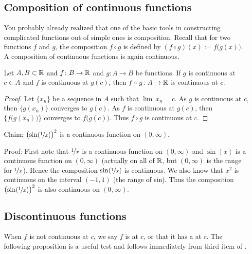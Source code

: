 \subsection{Composition of continuous functions}

You probably already realized that one of the basic tools in
constructing complicated functions out of simple ones is composition.
Recall that for two functions $f$ and $g$,
the composition $f \circ g$ is defined by
$(f \circ g)(x) := f\bigl(g(x)\bigr)$.
A composition of
continuous functions is again
continuous.

\begin{prop} \label{prop:compositioncont}
Let $A, B \subset {\mathbb{R}}$ and $f \colon B \to {\mathbb{R}}$ and $g \colon A \to B$ be
functions.  If $g$ is continuous at $c \in A$ and
$f$ is continuous at $g(c)$, then $f \circ g \colon A \to {\mathbb{R}}$ is continuous
at $c$.
\end{prop}

\begin{proof}
Let $\{ x_n \}$ be a sequence in $A$ such that $\lim\, x_n = c$.
As $g$ is continuous at $c$, then $\{ g(x_n) \}$ converges to $g(c)$.
As $f$ is continuous at $g(c)$, then $\{ f\bigl(g(x_n)\bigr) \}$ converges
to $f\bigl(g(c)\bigr)$.
Thus $f \circ g$ is continuous at $c$.
\end{proof}

\begin{example}
Claim: ${\bigl(\sin(\nicefrac{1}{x})\bigr)}^2$ is a continuous function on $(0,\infty)$.

Proof: First note that $\nicefrac{1}{x}$ is a continuous function on
$(0,\infty)$ and $\sin(x)$ is a continuous function on $(0,\infty)$ (actually
on all of ${\mathbb{R}}$, but $(0,\infty)$ is the range for $\nicefrac{1}{x}$).
Hence the composition $\sin(\nicefrac{1}{x})$ is continuous.  We also
know that $x^2$ is continuous on the interval $(-1,1)$ (the range of sin).  Thus
the composition
${\bigl(\sin(\nicefrac{1}{x})\bigr)}^2$ is also continuous on $(0,\infty)$.
\end{example}

\subsection{Discontinuous functions}

When $f$ is not continuous at $c$, we
say $f$ is \emph{} at $c$, or that it has a
\emph{} at $c$.
The following proposition is a useful test and follows immediately
from third item of .

